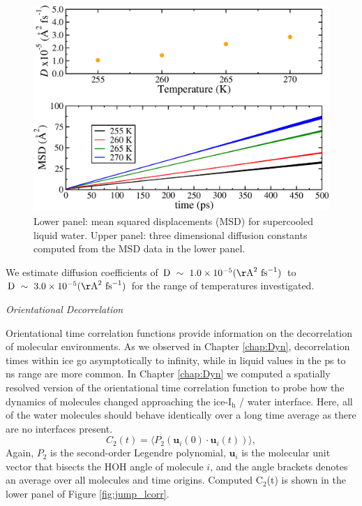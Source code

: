\begin{figure}
\includegraphics[width=\linewidth]{Figures/bulkD}
\caption{\label{fig:bulkD} Lower panel: mean squared displacements
  (MSD) for supercooled liquid water. Upper panel: three dimensional
  diffusion constants computed from the MSD data in the lower panel. }
\end{figure}    
 
We estimate diffusion coefficients of
$\mathrm{D}~\sim~ 1.0 \times 10^{-5}
(\mathrm{\AA}^{2}~\mathrm{fs}^{-1})$ to
$\mathrm{D}~\sim~ 3.0 \times 10^{-5}
(\mathrm{\AA}^{2}~\mathrm{fs}^{-1})$ for the range of temperatures
investigated. %


\begin{flushleft}
\textit{Orientational Decorrelation}
\end{flushleft}

Orientational time correlation functions provide information on the
decorrelation of molecular environments. As we observed in Chapter
\ref{chap:Dyn}, decorrelation times within ice go asymptotically to
infinity, while in liquid values in the ps to ns range are more
common. In Chapter \ref{chap:Dyn} we computed a spatially resolved
version of the orientational time correlation function to probe how
the dynamics of molecules changed approaching the ice-I$_\mathrm{h}$ /
water interface. Here, all of the water molecules should behave
identically over a long time average as there are no interfaces present.
\begin{equation}\label{C(t)}
  C_{2}(t)=\langle P_{2}(\mathbf{u}_i(0)\cdot \mathbf{u}_i(t))\rangle,
\end{equation}
Again, $P_2$ is the second-order Legendre polynomial, 
$\mathbf{u}_i$ is the molecular unit vector that bisects the HOH angle
of molecule $i$, and the angle brackets denotes an average over all
molecules and time origins. Computed C$_2$(t) is shown in the lower
panel of Figure \ref{fig:jump_lcorr}.


